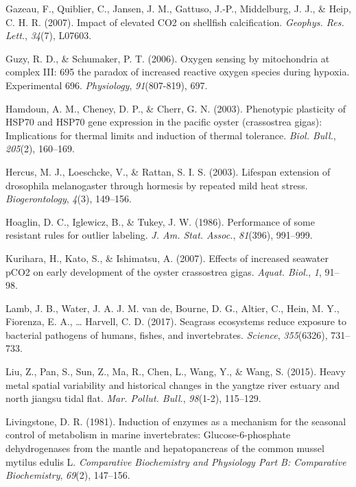 \documentclass [11pt, proquest] {uwthesis}[2015/03/03]
\newlength{\cslhangindent}
\newenvironment{CSLReferences}%
{\setlength{\parindent}{0pt}%
\everypar{\setlength{\hangindent}{\cslhangindent}}\ignorespaces}%
{\par}
\begin{document}
\begin{CSLReferences}{1}{0}
\leavevmode\hypertarget{ref-Gazeau2007}{}%
Gazeau, F., Quiblier, C., Jansen, J. M., Gattuso, J.-P., Middelburg, J. J., \& Heip, C. H. R. (2007). Impact of elevated {CO2} on shellfish calcification. \emph{Geophys. Res. Lett.}, \emph{34}(7), L07603.

\leavevmode\hypertarget{ref-Guzy2006}{}%
Guzy, R. D., \& Schumaker, P. T. (2006). Oxygen sensing by mitochondria at complex {III}: 695 the paradox of increased reactive oxygen species during hypoxia. Experimental 696. \emph{Physiology}, \emph{91}(807-819), 697.

\leavevmode\hypertarget{ref-Hamdoun2003}{}%
Hamdoun, A. M., Cheney, D. P., \& Cherr, G. N. (2003). Phenotypic plasticity of {HSP70} and {HSP70} gene expression in the pacific oyster (crassostrea gigas): Implications for thermal limits and induction of thermal tolerance. \emph{Biol. Bull.}, \emph{205}(2), 160--169.

\leavevmode\hypertarget{ref-Hercus2003}{}%
Hercus, M. J., Loeschcke, V., \& Rattan, S. I. S. (2003). Lifespan extension of drosophila melanogaster through hormesis by repeated mild heat stress. \emph{Biogerontology}, \emph{4}(3), 149--156.

\leavevmode\hypertarget{ref-Hoaglin1986}{}%
Hoaglin, D. C., Iglewicz, B., \& Tukey, J. W. (1986). Performance of some resistant rules for outlier labeling. \emph{J. Am. Stat. Assoc.}, \emph{81}(396), 991--999.

\leavevmode\hypertarget{ref-Kurihara2007}{}%
Kurihara, H., Kato, S., \& Ishimatsu, A. (2007). Effects of increased seawater {pCO2} on early development of the oyster crassostrea gigas. \emph{Aquat. Biol.}, \emph{1}, 91--98.

\leavevmode\hypertarget{ref-Lamb2017}{}%
Lamb, J. B., Water, J. A. J. M. van de, Bourne, D. G., Altier, C., Hein, M. Y., Fiorenza, E. A., \ldots{} Harvell, C. D. (2017). Seagrass ecosystems reduce exposure to bacterial pathogens of humans, fishes, and invertebrates. \emph{Science}, \emph{355}(6326), 731--733.

\leavevmode\hypertarget{ref-Liu2015}{}%
Liu, Z., Pan, S., Sun, Z., Ma, R., Chen, L., Wang, Y., \& Wang, S. (2015). Heavy metal spatial variability and historical changes in the yangtze river estuary and north jiangsu tidal flat. \emph{Mar. Pollut. Bull.}, \emph{98}(1-2), 115--129.

\leavevmode\hypertarget{ref-Livingstone1981}{}%
Livingstone, D. R. (1981). Induction of enzymes as a mechanism for the seasonal control of metabolism in marine invertebrates: Glucose-6-phosphate dehydrogenases from the mantle and hepatopancreas of the common mussel mytilus edulis {L}. \emph{Comparative Biochemistry and Physiology Part B: Comparative Biochemistry}, \emph{69}(2), 147--156.


\end{CSLReferences}
\end{document}
